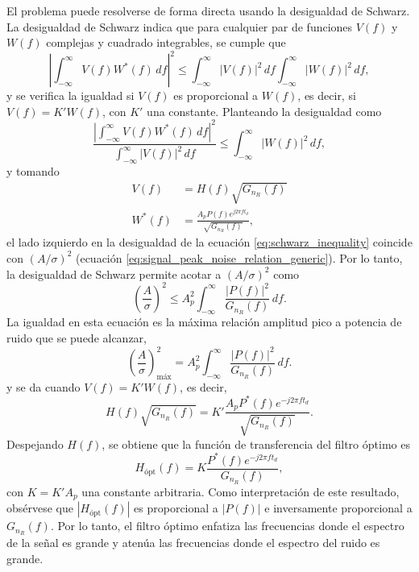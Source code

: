 \documentclass[a4paper]{article}
\begin{document}
El problema puede resolverse de forma directa usando la desigualdad de Schwarz. La desigualdad de Schwarz indica que para cualquier par de funciones \(V(f)\) y \(W(f)\) complejas y cuadrado integrables, se cumple que
\[
\left|\int_{-\infty}^{\infty}V(f)W^*(f)\,df\right|^2\leq \int_{-\infty}^{\infty}\left|V(f)\right|^2\,df \int_{-\infty}^{\infty}\left|W(f)\right|^2\,df,
\]
y se verifica la igualdad si \(V(f)\) es proporcional a \(W(f)\), es decir, si \(V(f)=K'W(f)\), con \(K'\) una constante. Planteando la desigualdad como
\begin{equation}\label{eq:schwarz_inequality}
\frac{\left|\displaystyle\int_{-\infty}^{\infty}V(f)W^*(f)\,df\right|^2}{\displaystyle\int_{-\infty}^{\infty}\left|V(f)\right|^2\,df}\leq \int_{-\infty}^{\infty}\left|W(f)\right|^2\,df, 
\end{equation}
y tomando
\begin{align*}
 V(f)&=H(f)\sqrt{G_{n_R}(f)}\\
 W^*(f)&=\frac{A_pP(f)e^{j2\pi ft_d}}{\sqrt{G_{n_R}(f)}},
\end{align*}
el lado izquierdo en la desigualdad de la ecuación \ref{eq:schwarz_inequality} coincide con \((A/\sigma)^2\) (ecuación \ref{eq:signal_peak_noise_relation_generic}). Por lo tanto, la desigualdad de Schwarz permite acotar  a \((A/\sigma)^2\) como
\begin{equation*}
 \left(\frac{A}{\sigma}\right)^2 \leq A_p^2\int_{-\infty}^{\infty}\frac{\left|P(f)\right|^2}{G_{n_R}(f)}\,df.
\end{equation*}
La igualdad en esta ecuación es la máxima relación amplitud pico a potencia de ruido que se puede alcanzar,
\begin{equation}\label{eq:signal_peak_noise_relation_optimal}
 \left(\frac{A}{\sigma}\right)_\textrm{máx}^2 = A_p^2\int_{-\infty}^{\infty}\frac{\left|P(f)\right|^2}{G_{n_R}(f)}\,df.
\end{equation}
y se da cuando \(V(f)=K'W(f)\), es decir,
\[
 H(f)\sqrt{G_{n_R}(f)} = K'\frac{A_pP^*(f)e^{-j2\pi ft_d}}{\sqrt{G_{n_R}(f)}}.
\]
Despejando \(H(f)\), se obtiene que la función de transferencia del filtro óptimo es
\begin{equation}\label{eq:matched_filter_transfer_function}
 H_{\textrm{ópt}}(f) = K\frac{P^*(f)e^{-j2\pi ft_d}}{G_{n_R}(f)},
\end{equation}
con \(K=K'A_p\) una constante arbitraria. Como interpretación de este resultado, obsérvese que \(\left|H_{\textrm{ópt}}(f)\right|\) es proporcional a \(\left|P(f)\right|\) e inversamente proporcional a \(G_{n_R}(f)\). Por lo tanto, el filtro óptimo enfatiza las frecuencias donde el espectro de la señal es grande y atenúa las frecuencias donde el espectro del ruido es grande.
\end{document}

